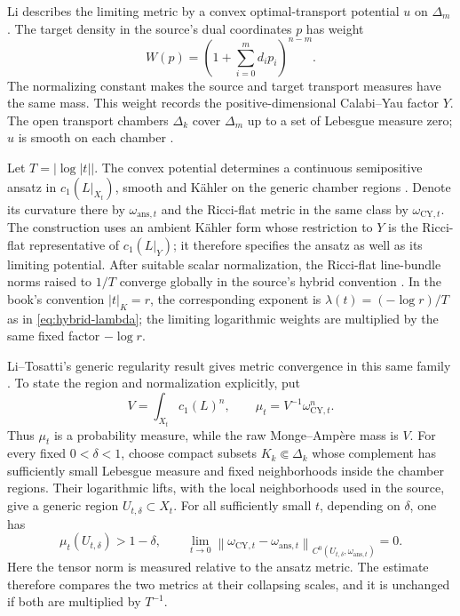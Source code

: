 Li describes the limiting metric by a convex optimal-transport potential
$u$ on $\Delta_m$ \cite[Sections~3--5]{Li25Intermediate}. The target
density in the source's dual coordinates $p$ has weight
\[
 W(p)=\left(1+\sum_{i=0}^m d_i p_i\right)^{n-m}.
\tag{66.34e}\label{eq:hybrid-intermediate-transport}
\]
The normalizing constant makes the source and target transport measures
have the same mass. This weight records the positive-dimensional
Calabi--Yau factor $Y$. The open transport chambers $\Delta_k$ cover
$\Delta_m$ up to a set of Lebesgue measure zero; $u$ is smooth on each
chamber \cite[Corollary~4.6 and Lemma~4.7]{Li25Intermediate}.

Let $T=|\log|t||$. The convex potential determines a continuous
semipositive ansatz in $c_1(L|_{X_t})$, smooth and K\"ahler on the generic
chamber regions \cite[Section~5]{Li25Intermediate}. Denote its curvature
there by $\omega_{\mathrm{ans},t}$ and the Ricci-flat metric in the same
class by $\omega_{\mathrm{CY},t}$. The construction uses an ambient
K\"ahler form whose restriction to $Y$ is the Ricci-flat representative of
$c_1(L|_Y)$; it therefore specifies the ansatz as well as its limiting
potential. After suitable scalar normalization, the Ricci-flat line-bundle
norms raised to $1/T$ converge globally in the source's hybrid convention
\cite[Theorem~1.1 and Proposition~6.13]{Li25Intermediate}. In the book's
convention $|t|_K=r$, the corresponding exponent is
$\lambda(t)=(-\log r)/T$ as in \eqref{eq:hybrid-lambda}; the limiting
logarithmic weights are multiplied by the same fixed factor $-\log r$.

Li--Tosatti's generic regularity result gives metric convergence in this
same family \cite[Theorem~1.1]{LT26Intermediate}. To state the region and
normalization explicitly, put
\[
 V=\int_{X_t}c_1(L)^n,\qquad
 \mu_t=V^{-1}\omega_{\mathrm{CY},t}^{n}.
\]
Thus $\mu_t$ is a probability measure, while the raw Monge--Amp\`ere
mass is $V$. For every fixed $0<\delta<1$, choose compact subsets
$K_k\Subset\Delta_k$ whose complement has sufficiently small Lebesgue
measure and fixed neighborhoods inside the chamber regions. Their
logarithmic lifts, with the local neighborhoods used in the source,
give a generic region $U_{t,\delta}\subset X_t$. For all sufficiently
small $t$, depending on $\delta$, one has
\[
 \mu_t(U_{t,\delta})>1-\delta,\qquad
 \lim_{t\to0}
 \left\|\omega_{\mathrm{CY},t}-\omega_{\mathrm{ans},t}\right\|_
 {C^0(U_{t,\delta},\omega_{\mathrm{ans},t})}=0.
\tag{66.34f}\label{eq:hybrid-intermediate-generic-metric}
\]
Here the tensor norm is measured relative to the ansatz metric. The
estimate therefore compares the two metrics at their collapsing scales,
and it is unchanged if both are multiplied by $T^{-1}$.

